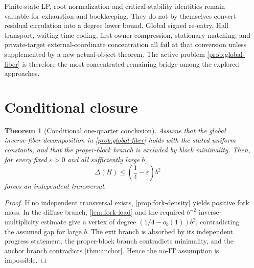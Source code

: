 \documentclass[11pt]{article}
\newtheorem{theorem}{Theorem}[section]
\begin{document}
Finite-state LP, root normalization and critical-stability identities remain
valuable for exhaustion and bookkeeping.  They do not by themselves convert
residual circulation into a degree lower bound.  Global signed re-entry, Hall
transport, waiting-time coding, first-owner compression, stationary matching,
and private-target external-coordinate concentration all fail at that
conversion unless supplemented by a new actual-object theorem.  The active
problem \cref{prob:global-fiber} is therefore the most concentrated remaining
bridge among the explored approaches.

\section{Conditional closure}

\begin{theorem}[Conditional one-quarter conclusion]
Assume that the global inverse-fiber decomposition in
\cref{prob:global-fiber} holds with the stated uniform constants, and that the
proper-block branch is excluded by block minimality.  Then, for every fixed
\(\varepsilon>0\) and all sufficiently large \(b\),
\[
  \Delta(H)\le\left(\frac14-\varepsilon\right)b^2
\]
forces an independent transversal.
\end{theorem}

\begin{proof}
If no independent transversal exists, \cref{prop:fork-density} yields positive
fork mass.  In the diffuse branch, \cref{lem:fork-load} and the required
\(b^{-2}\) inverse-multiplicity estimate give a vertex of degree
\((1/4-o_b(1))b^2\), contradicting the assumed gap for large \(b\).  The exit
branch is absorbed by its independent progress statement, the proper-block
branch contradicts minimality, and the anchor branch contradicts
\cref{thm:anchor}.  Hence the no-IT assumption is impossible.
\end{proof}
\end{document}
